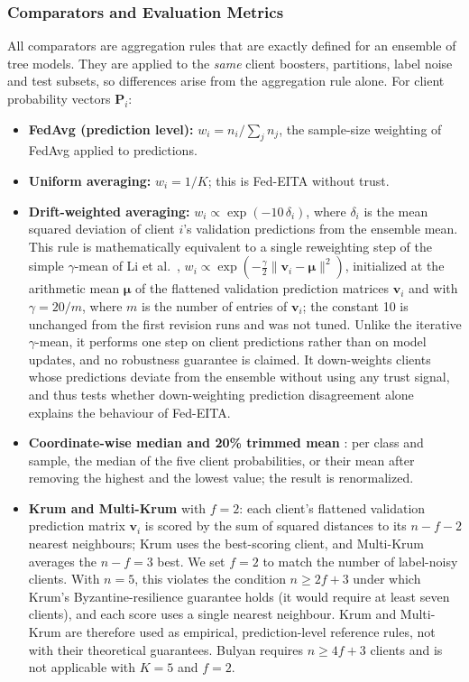 \documentclass[pdflatex,sn-mathphys-num]{sn-jnl}
\begin{document}
{{\subsubsection{Comparators and Evaluation Metrics}\label{sec:comparators}
All comparators are aggregation rules that are exactly defined for an ensemble of tree models. They are applied to the \emph{same} client boosters, partitions, label noise and test subsets, so differences arise from the aggregation rule alone. For client probability vectors $\mathbf{P}_i$:
\begin{itemize}
\item \textbf{FedAvg (prediction level):} $w_i=n_i/\sum_j n_j$, the sample-size weighting of FedAvg \cite{mcmahan2017fedavg} applied to predictions.
\item \textbf{Uniform averaging:} $w_i=1/K$; this is Fed-EITA without trust.
\item \textbf{Drift-weighted averaging:} $w_i\propto\exp(-10\,\delta_i)$, where $\delta_i$ is the mean squared deviation of client $i$'s validation predictions from the ensemble mean.
This rule is mathematically equivalent to a single reweighting step of the simple $\gamma$-mean of Li et al.\ \cite{li2022gamma}, $w_i\propto\exp(-\tfrac{\gamma}{2}\lVert\mathbf{v}_i-\boldsymbol{\mu}\rVert^2)$, initialized at the arithmetic mean $\boldsymbol{\mu}$ of the flattened validation prediction matrices $\mathbf{v}_i$ and with $\gamma=20/m$, where $m$ is the number of entries of $\mathbf{v}_i$; the constant 10 is unchanged from the first revision runs and was not tuned. Unlike the iterative $\gamma$-mean, it performs one step on client predictions rather than on model updates, and no robustness guarantee is claimed. It down-weights clients whose predictions deviate from the ensemble without using any trust signal, and thus tests whether down-weighting prediction disagreement alone explains the behaviour of Fed-EITA.
\item \textbf{Coordinate-wise median and 20\% trimmed mean} \cite{yin2018byzantine}: per class and sample, the median of the five client probabilities, or their mean after removing the highest and the lowest value; the result is renormalized.
\item \textbf{Krum and Multi-Krum} \cite{blanchard2017machine} with $f=2$: each client's flattened validation prediction matrix $\mathbf{v}_i$ is scored by the sum of squared distances to its $n-f-2$ nearest neighbours; Krum uses the best-scoring client, and Multi-Krum averages the $n-f=3$ best. We set $f=2$ to match the number of label-noisy clients. With $n=5$, this violates the condition $n\geq 2f+3$ under which Krum's Byzantine-resilience guarantee holds (it would require at least seven clients), and each score uses a single nearest neighbour. Krum and Multi-Krum are therefore used as empirical, prediction-level reference rules, not with their theoretical guarantees. Bulyan \cite{mhamdi2018hidden} requires $n\geq 4f+3$ clients and is not applicable with $K=5$ and $f=2$.

\end{itemize}}}
\end{document}
